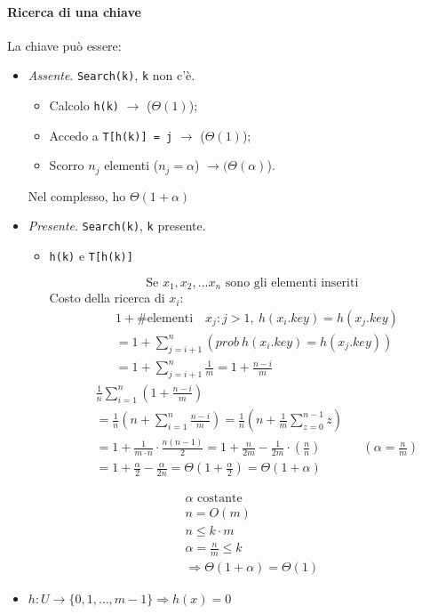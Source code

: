 \paragraph{Ricerca di una chiave} La chiave può essere:
\begin{itemize}
	\item \emph{Assente}. \texttt{Search(k)}, \texttt{k} non c'è.
	\begin{itemize}
		\item Calcolo \texttt{h(k)} $\rightarrow$ ($\Theta(1)$);
		\item Accedo a \texttt{T[h(k)] = j} $\rightarrow$ ($\Theta(1)$);
		\item Scorro $n_j$ elementi ($n_j = \alpha$) $\rightarrow (\Theta(\alpha)$).  
	\end{itemize}
	Nel complesso, ho $\Theta(1+\alpha)$

	\item \emph{Presente}. \texttt{Search(k)}, \texttt{k} presente.
	\begin{itemize}
		\item \texttt{h(k)} e \texttt{T[h(k)]}\par
			$$\text{Se } x_1, x_2,\dots x_n \text{ sono gli elementi inseriti}$$
		Costo della ricerca di $x_i$:
		\begin{align*}
			& 1 + \text{\# elementi} \quad x_j : j > 1, \ h(x_i.key) = h(x_j.key) \\
			& = 1 + \displaystyle\sum_{j=i+1}^n \left(prob \ h(x_i.key) = h(x_j.key)\right) \\
			& = 1 + \displaystyle\sum_{j=i+1}^n \frac{1}{m} = 1 + \frac{n-i}{m}
		\end{align*}
		\begin{align*}
			& \frac{1}{n} \displaystyle\sum_{i=1}^n \left( 1 + \frac{n-i}{m} \right) \\
			& = \frac{1}{n} \left( n + \displaystyle\sum_{i=1}^n \frac{n-i}{m} \right) 
				= \frac{1}{n} \left( n + \frac{1}{m} \displaystyle\sum_{z=0}^{n-1} z \right) \\
			& = 1 + \frac{1}{m \cdot n} \cdot \frac{n(n-1)}{2} = 1 + \frac{n}{2m} - \frac{1}{2m} \cdot \left(\frac{n}{n} \right) && \left(\alpha = \frac{n}{m}\right) \\
			& = 1 + \frac{\alpha}{2} - \frac{\alpha}{2n} = \Theta(1+ \frac{\alpha}{2}) = \Theta(1+ \alpha)
		\end{align*}

		\begin{gather*}
			\alpha \text{ costante} \\
			n = O(m) \\
			n \leq k \cdot m \\
			\alpha = \frac{n}{m} \leq k \\
			\Rightarrow \Theta(1 + \alpha) = \Theta(1)
		\end{gather*}
	\end{itemize}
	\item $h \colon U \to \{ 0,1,\dots,m-1 \} \Rightarrow h(x) = 0$
\end{itemize}

